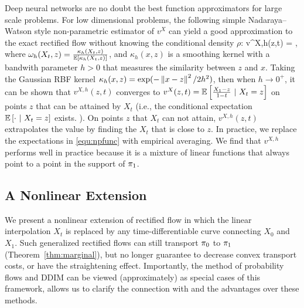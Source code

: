 Deep neural networks are no doubt the best function approximators for large scale problems. 
For low dimensional problems, 
the following simple Nadaraya–Watson style non-parametric estimator of  $v^X$ 
can yield a good approximation to the exact rectified flow 
without knowing
the conditional density $\rho$: 
\bbb \label{equ:npfunc}
v^{X,h}(z,t) 
=  ,  %
\eee  
where $\omega_h(X_t,z) = \frac{\kappa_h(X_t, z)}{\mathbb{E}\left[\kappa_h( X_t,z)\right]} $, and  $\kappa_h(x,z)$ is a smoothing kernel with a bandwith parameter $h>0$ 
that measures the similarity between $z$ and $x$.  
Taking the Gaussian RBF kernel $\kappa_h(x, z) = \exp(-\left\lVert x-z\right\rVert^2/2h^2)$, 
then when $h\to 0^+$, 
it can be shown that 
$v^{X,h}(z,t)$   converges to $v^X(z,t) = \mathbb{E}\left[\frac{X_1-z}{1-t} ~|~X_t=z\right]$
on points $z$ 
that can be attained by $X_t$ (i.e., the conditional expectation $\mathbb{E}\left[\cdot~|~X_t = z\right]$ exists. ). 
On points $z$ that $X_t$ can not attain, 
$v^{X,h}(z,t)$ extrapolates the value by finding the $X_t$ that is close to $z$. 
In practice, we replace the expectations in \eqref{equ:npfunc} with empirical averaging. 
We find that $v^{X,h}$ performs well in practice 
because it is a mixture of linear functions that always point to a point 
in the support of ${\pi}_1$. 











\subsection{A Nonlinear Extension} %
\label{sec:nonlinear}

We %
present a nonlinear
  extension of rectified flow  
  in which the  linear interpolation  $X_t$  is replaced by any time-differentiable curve connecting $X_0$ and $X_1$. 
    Such generalized rectified flows can still  transport ${\pi}_0$ to ${\pi}_1$ (Theorem~\ref{thm:marginal}),  
    but no longer guarantee to decrease convex transport costs, or have the straightening effect. 
Importantly, 
the method of  probability flows \citep{song2020score} and  DDIM \citep{song2020denoising} can be viewed (approximately) as special cases of this framework, 
allows us to clarify the connection with and the advantages over these methods. 

